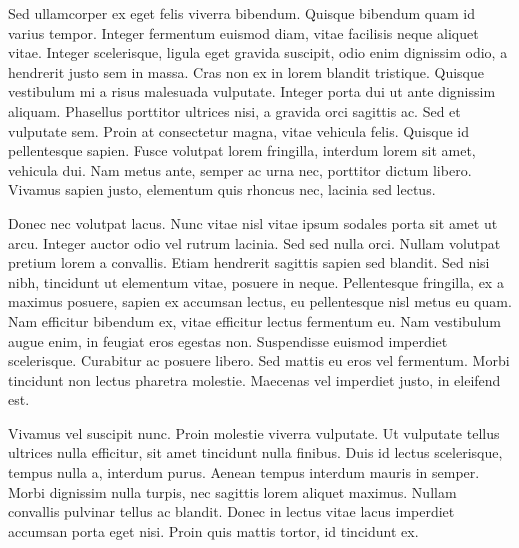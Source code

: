 \documentclass{fancy-article}
\begin{document}
\AP Sed ullamcorper ex eget felis viverra bibendum. Quisque bibendum quam id varius tempor. Integer fermentum euismod diam, vitae facilisis neque aliquet vitae. Integer scelerisque, ligula eget gravida suscipit, odio enim dignissim odio, a hendrerit justo sem in massa. Cras non ex in lorem blandit tristique. Quisque vestibulum mi a risus malesuada vulputate. Integer porta dui ut ante dignissim aliquam. Phasellus porttitor ultrices nisi, a gravida orci sagittis ac. Sed et vulputate sem. Proin at consectetur magna, vitae vehicula felis. Quisque id pellentesque sapien. Fusce volutpat lorem fringilla, interdum lorem sit amet, vehicula dui. Nam metus ante, semper ac urna nec, porttitor dictum libero. Vivamus sapien justo, elementum quis rhoncus nec, lacinia sed lectus.

\AP Donec nec volutpat lacus. Nunc vitae nisl vitae ipsum sodales porta sit amet ut arcu. Integer auctor odio vel rutrum lacinia. Sed sed nulla orci. Nullam volutpat pretium lorem a convallis. Etiam hendrerit sagittis sapien sed blandit. Sed nisi nibh, tincidunt ut elementum vitae, posuere in neque. Pellentesque fringilla, ex a maximus posuere, sapien ex accumsan lectus, eu pellentesque nisl metus eu quam. Nam efficitur bibendum ex, vitae efficitur lectus fermentum eu. Nam vestibulum augue enim, in feugiat eros egestas non. Suspendisse euismod imperdiet scelerisque. Curabitur ac posuere libero. Sed mattis eu eros vel fermentum. Morbi tincidunt non lectus pharetra molestie. Maecenas vel imperdiet justo, in eleifend est.

\AP Vivamus vel suscipit nunc. Proin molestie viverra vulputate. Ut vulputate tellus ultrices nulla efficitur, sit amet tincidunt nulla finibus. Duis id lectus scelerisque, tempus nulla a, interdum purus. Aenean tempus interdum mauris in semper. Morbi dignissim nulla turpis, nec sagittis lorem aliquet maximus. Nullam convallis pulvinar tellus ac blandit. Donec in lectus vitae lacus imperdiet accumsan porta eget nisi. Proin quis mattis tortor, id tincidunt ex.

\printbibliography
\end{document}
